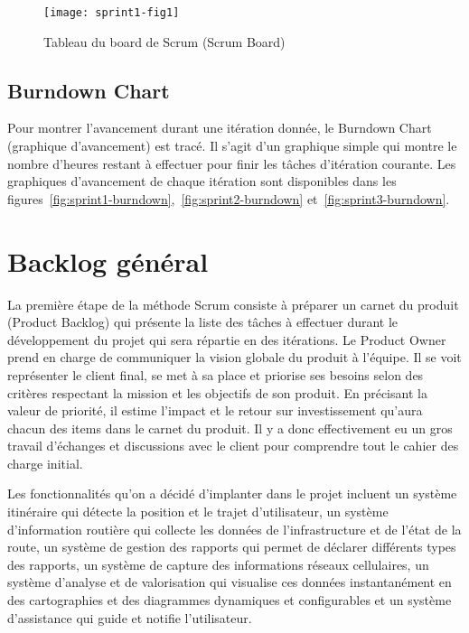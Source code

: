 \begin{figure}[H]
    \centering
    \texttt{[image: sprint1-fig1]}
    \caption{Tableau du board de Scrum (Scrum Board)}
\label{fig:scrum-board}
\end{figure}

\subsection{Burndown Chart}

Pour montrer l'avancement durant une itération donnée, le Burndown Chart
(graphique d'avancement) est tracé. Il s'agit d'un graphique simple qui montre
le nombre d'heures restant à effectuer pour finir les tâches d'itération
courante. Les graphiques d'avancement de chaque itération sont disponibles dans
les figures~\ref{fig:sprint1-burndown},~\ref{fig:sprint2-burndown}
et~\ref{fig:sprint3-burndown}.

\section{Backlog général}

La première étape de la méthode Scrum consiste à préparer un carnet du produit
(Product Backlog) qui présente la liste des tâches à effectuer durant le
développement du projet qui sera répartie en des itérations. Le Product Owner
prend en charge de communiquer la vision globale du produit à l'équipe. Il se
voit représenter le client final, se met à sa place et priorise ses besoins
selon des critères respectant la mission et les objectifs de son produit. En
précisant la valeur de priorité, il estime l'impact et le retour sur
investissement qu'aura chacun des items dans le carnet du produit. Il y a donc
effectivement eu un gros travail d'échanges et discussions avec le client pour
comprendre tout le cahier des charge initial.

Les fonctionnalités qu'on a décidé d'implanter dans le projet  incluent un système itinéraire qui détecte la position et le trajet
d'utilisateur, un système d'information routière qui collecte les données de
l'infrastructure et de l'état de la route, un système de gestion des rapports
qui permet de déclarer différents types des rapports, un système de capture des
informations réseaux cellulaires, un système d'analyse et de valorisation qui
visualise ces données instantanément en des cartographies et des diagrammes
dynamiques et configurables et un système d'assistance qui guide et notifie
l'utilisateur.

